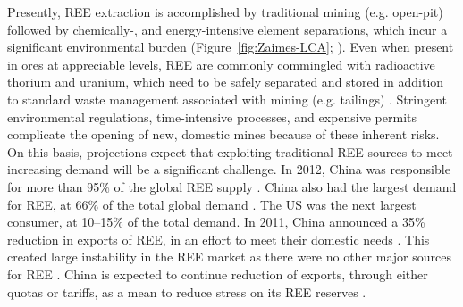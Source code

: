 Presently, REE extraction is accomplished by traditional mining (e.g. open-pit) followed by chemically-, and energy-intensive element separations, which incur a significant environmental burden (Figure~\ref{fig:Zaimes-LCA}; \citep{Zaimes_SCE_2015}).
Even when present in ores at appreciable levels, REE are commonly commingled with radioactive thorium and uranium, which need to be safely separated and stored in addition to standard waste management associated with mining (e.g. tailings) \citep{Gupta_IMR_1992, Sprecher_EST_2014}.
Stringent environmental regulations, time-intensive processes, and expensive permits complicate the opening of new, domestic mines because of these inherent risks.
On this basis, projections expect that exploiting traditional REE sources to meet increasing demand will be a significant challenge.
In 2012, China was responsible for more than 95\% of the global REE supply \citep{USGS_commsumm}.
China also had the largest demand for REE, at 66\% of the total global demand \citep{USGS_commsumm}.
The US was the next largest consumer, at 10--15\% of the total demand.
In 2011, China announced a 35\% reduction in exports of REE, in an effort to meet their domestic needs \citep{USGS_minyb_2012}.
This created large instability in the REE market as there were no other major sources for REE \citep{Alonso_EST_2012, Chakmour_Elem_2012, Hatch_Elem_2012}.
China is expected to continue reduction of exports, through either quotas or tariffs, as a mean to reduce stress on its REE reserves \citep{FrostSullivan_REEmarket, USGS_commsumm}.

